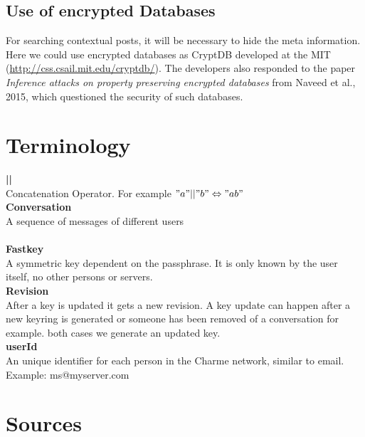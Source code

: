 \documentclass{scrartcl}
\begin{document}
\subsection{Use of encrypted Databases}
For searching contextual posts, it will be necessary to hide the meta information. Here we could use encrypted databases as CryptDB developed at the MIT (\url{http://css.csail.mit.edu/cryptdb/}). The developers also responded to the paper  \emph{Inference attacks on property preserving encrypted databases }from Naveed et al., 2015, which questioned the security of such databases.



\section{Terminology}

\textbf{||}\\
 Concatenation Operator. For example $"a" || "b" \Leftrightarrow "ab" $
\\


\textbf{Conversation}\\ A sequence of messages of different users
\\\\
\textbf{Fastkey}\\ A symmetric key dependent on the passphrase. It is only known by the user itself, no other persons or servers.
\\

\textbf{Revision}\\
 After a key is updated it gets a new revision. A key update can happen after a new keyring is generated or someone has been removed of a conversation for example. both cases we generate an updated key.
\\

\textbf{userId}\\  An unique identifier for each person in the Charme network, similar to email. Example: ms@myserver.com



\section{Sources}
\printbibliography




  
\end{document}
